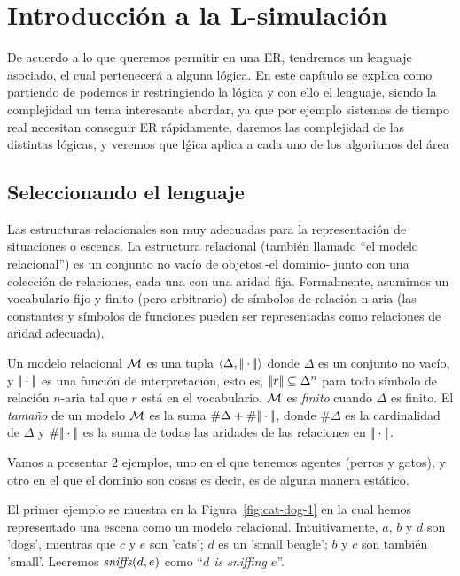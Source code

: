 \chapter{Introducci\'on a la L-simulaci\'on}
\label{sec:intro_logica}

De acuerdo a lo que queremos permitir en una ER, tendremos un lenguaje asociado, el cual pertenecer\'a a alguna l\'ogica. En este cap\'itulo se explica como partiendo de \FOL podemos ir restringiendo la l\'ogica y con ello el lenguaje, siendo la complejidad un tema interesante abordar, ya que por ejemplo sistemas de tiempo real necesitan conseguir ER r\'apidamente, daremos las complejidad de las distintas l\'ogicas, y veremos que l\'gica aplica a cada uno de los algoritmos del \'area



\section{Seleccionando el lenguaje}


Las estructuras relacionales son muy adecuadas para la representaci\'on de situaciones o escenas. La estructura relacional (tambi\'en llamado ``el modelo relacional'') es un conjunto no vac\'io de objetos -el dominio- junto con una colecci\'on de relaciones, cada una con una aridad fija.
Formalmente, asumimos un vocabulario fijo y finito (pero arbitrario) de
s\'imbolos de relaci\'on n-aria (las constantes y s\'imbolos de funciones pueden ser representadas como relaciones de aridad adecuada). 


Un modelo relacional $\mathcal{M}$ es una tupla 
$\langle \Delta,|\!|\cdot|\!| \rangle$ donde $\Delta$ es un conjunto no vac\'io, y
$|\!|\cdot|\!|$ es una funci\'on de interpretaci\'on, esto es,
$|\!|r|\!| \subseteq \Delta^n$ para todo s\'imbolo de relaci\'on $n$-aria tal que
$r$ est\'a en el vocabulario. $\mathcal{M}$ es \emph{finito} cuando
$\Delta$ es finito.  El \emph{tama\~no} de un modelo $\mathcal{M}$ es la suma
$\#\Delta + \#|\!|\cdot|\!|$, donde $\#\Delta$ es la cardinalidad
de $\Delta$ y $\#|\!|\cdot|\!|$ es la suma de todas las aridades de las
relaciones en $|\!|\cdot|\!|$.

Vamos a presentar 2 ejemplos, uno en el que tenemos agentes (perros y gatos), y otro en el que el dominio son cosas es decir, es de alguna manera est\'atico.

El primer ejemplo se muestra en la Figura~\ref{fig:cat-dog-1} en la cual hemos representado una escena
como un modelo relacional. Intuitivamente, $a$, $b$ y $d$ son 'dogs', mientras que 
$c$ y $e$ son 'cats';  $d$ es un 'small beagle';
 $b$ y $c$ son tambi\'en 'small'.
 Leeremos $\mathit{sniffs}(d,e)$ como ``{\em $d$ is sniffing $e$}''.\\

